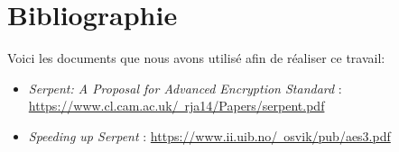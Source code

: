 \documentclass{article}
\begin{document}
\section{Bibliographie}

Voici les documents que nous avons utilisé afin de réaliser ce travail:

\medbreak
\begin{itemize}
\item \textit{Serpent: A Proposal for Advanced Encryption Standard} : \underline{https://www.cl.cam.ac.uk/~rja14/Papers/serpent.pdf}
\medbreak

\item \textit{Speeding up Serpent} : \underline{https://www.ii.uib.no/~osvik/pub/aes3.pdf}
\end{itemize}
\end{document}
